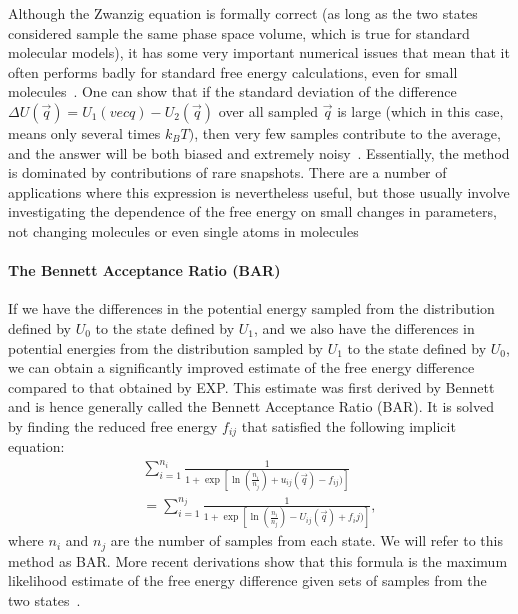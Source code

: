 \documentclass[9pt,bestpractices]{livecoms}
\begin{document}
%
Although the Zwanzig equation is formally correct (as long as the two states considered sample the same phase space volume, which is true for standard molecular models), it has some very important numerical issues that mean that it often performs badly for standard free energy calculations, even for small molecules~\cite{shirts2005comparison,lu2003appropriate}.  One can show that if the standard deviation of the difference $\Delta U(\vec{q}) = U_1(vec{q})-U_2(\vec{q})$ over all sampled $\vec{q}$ is large (which in this case, means only several times $k_BT)$, then very few samples contribute to the average, and the answer will be both biased and extremely noisy~\cite{lelievre2010free}. Essentially, the method is dominated by contributions of rare snapshots\cite{jarzynski2006rare, wu2005phasespaceb, wu2005phasespacec}. There are a number of applications where this expression is nevertheless useful, but those usually involve investigating the dependence of the free energy on small changes in parameters, not changing molecules or even single atoms in molecules~\cite{xx}
%
\paragraph{The Bennett Acceptance Ratio (BAR)}
%
If we have the differences in the potential energy sampled from the distribution defined by $U_0$ to the state defined by $U_1$, and we also have the differences in potential energies from the distribution sampled by $U_1$ to the state defined by $U_0$, we can obtain a significantly improved estimate of the
free energy difference compared to that obtained by EXP. 
This estimate was first derived by Bennett and is hence generally called the Bennett Acceptance Ratio (BAR).  It is solved by finding the reduced free energy $f_{ij}$ that satisfied the following implicit equation:
\begin{eqnarray}
 \sum_{i=1}^{n_i} \frac{1}{1 + \exp[\ln(\frac{n_i}{n_j}) + u_{ij}(\vec{q}) - f_{ij})
 ]} \nonumber \\
 =\sum_{i=1}^{n_j} \frac{1}{1 + \exp[\ln(\frac{n_i}{n_j}) - U_{ij}(\vec{q}) + f_ij)]},
\end{eqnarray}
where $n_i$ and $n_j$ are the number of samples from each state. We
will refer to this method as BAR. More recent derivations show that this formula is the maximum likelihood estimate of the free energy difference given sets of samples from the two states~\cite{bennett1976efficient,shirts2003equilibriuma}. 
\end{document}
